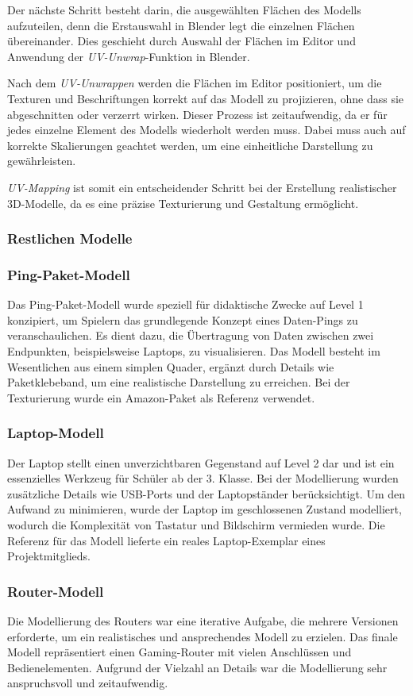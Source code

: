 Der nächste Schritt besteht darin, die ausgewählten Flächen des Modells aufzuteilen, denn die Erstauswahl in Blender
legt die einzelnen Flächen übereinander. Dies geschieht durch Auswahl der Flächen im Editor und Anwendung der
\textit{UV-Unwrap}-Funktion in Blender.

Nach dem \textit{UV-Unwrappen} werden die Flächen im Editor positioniert, um die Texturen und Beschriftungen korrekt auf
das Modell zu projizieren, ohne dass sie abgeschnitten oder verzerrt wirken. Dieser Prozess ist zeitaufwendig, da er für
jedes einzelne Element des Modells wiederholt werden muss. Dabei muss auch auf korrekte Skalierungen geachtet werden, um
eine einheitliche Darstellung zu gewährleisten.

\textit{UV-Mapping} ist somit ein entscheidender Schritt bei der Erstellung realistischer 3D-Modelle, da es eine präzise
Texturierung und Gestaltung ermöglicht.

\subsubsection{Restlichen Modelle}
\subsubsection*{Ping-Paket-Modell}
Das Ping-Paket-Modell wurde speziell für didaktische Zwecke auf Level 1 konzipiert, um Spielern das grundlegende Konzept
eines Daten-Pings zu veranschaulichen. Es dient dazu, die Übertragung von Daten zwischen zwei Endpunkten, beispielsweise
Laptops, zu visualisieren. Das Modell besteht im Wesentlichen aus einem simplen Quader, ergänzt durch Details wie
Paketklebeband, um eine realistische Darstellung zu erreichen. Bei der Texturierung wurde ein Amazon-Paket als Referenz verwendet.

\subsubsection*{Laptop-Modell}
Der Laptop stellt einen unverzichtbaren Gegenstand auf Level 2 dar und ist ein essenzielles Werkzeug für Schüler ab der
3. Klasse. Bei der Modellierung wurden zusätzliche Details wie USB-Ports und der Laptopständer berücksichtigt. Um den
Aufwand zu minimieren, wurde der Laptop im geschlossenen Zustand modelliert, wodurch die Komplexität von Tastatur und
Bildschirm vermieden wurde. Die Referenz für das Modell lieferte ein reales Laptop-Exemplar eines Projektmitglieds.

\subsubsection*{Router-Modell}
Die Modellierung des Routers war eine iterative Aufgabe, die mehrere Versionen erforderte, um ein realistisches und
ansprechendes Modell zu erzielen. Das finale Modell repräsentiert einen Gaming-Router mit vielen Anschlüssen und Bedienelementen.
Aufgrund der Vielzahl an Details war die Modellierung sehr anspruchsvoll und zeitaufwendig.

